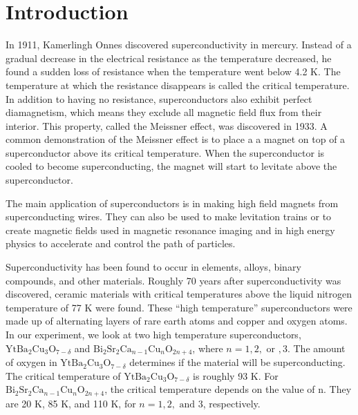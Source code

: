 \documentclass[prb,preprint]{revtex4-1}
\begin{document}
\maketitle %


\section{Introduction} %
In 1911, Kamerlingh Onnes discovered superconductivity in mercury.  
Instead of a gradual decrease in the electrical resistance as the temperature decreased, he found a sudden loss of resistance when the temperature went below 4.2 K. 
The temperature at which the resistance disappears is called the critical temperature.
In addition to having no resistance, superconductors also exhibit perfect diamagnetism, which means they exclude all magnetic field flux from their interior. 
This property, called the Meissner effect, was discovered in 1933.\cite{intro}
A common demonstration of the Meissner effect is to place a a magnet on top of a superconductor above its critical temperature. When the superconductor is cooled to become superconducting, the magnet will start to levitate above the superconductor. 

The main application of superconductors is in making high field magnets from superconducting wires. They can also be used to make levitation trains or to create magnetic fields used in magnetic resonance imaging and in high energy physics to accelerate and control the path of particles.\cite{kumar} 

Superconductivity has been found to occur in elements, alloys, binary compounds, and other materials.  
Roughly 70 years after superconductivity was discovered, ceramic materials with critical temperatures above the liquid nitrogen temperature of 77 K were found.\cite{melissinos} 
These ``high temperature'' superconductors were made up of alternating layers of rare earth atoms and copper and oxygen atoms.\cite{kumar} 
In our experiment, we look at two high temperature superconductors, $\text{Yt}\text{Ba}_{2}\text{Cu}_{3}\text{O}_{7-\delta}$ and $\text{Bi}_{2}\text{Sr}_{2}\text{Ca}_{n-1}\text{Cu}_{n}\text{O}_{2n+4}$, where $n=1,2,\text{ or },3$. %
The amount of oxygen in $\text{Yt}\text{Ba}_{2}\text{Cu}_{3}\text{O}_{7-\delta}$ determines if the material will be superconducting.\cite{colo} The critical temperature of $\text{Yt}\text{Ba}_{2}\text{Cu}_{3}\text{O}_{7-\delta}$ is roughly 93 K.\cite{ybcotemp}
For $\text{Bi}_{2}\text{Sr}_{2}\text{Ca}_{n-1}\text{Cu}_{n}\text{O}_{2n+4}$, the critical temperature depends on the value of n.  
They are 20 K, 85 K, and 110 K, for $n=1,2,\text{ and }3$, respectively.\cite{temps}
\end{document}
